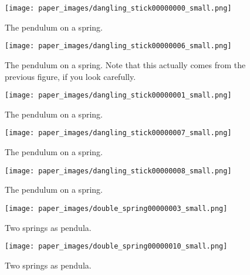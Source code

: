 \documentclass{article}
\begin{document}
\begin{figure}
\centering
\texttt{[image: paper\_images/dangling\_stick00000000\_small.png]} 
\caption{The pendulum on a spring.}
\end{figure}

\begin{figure}
\centering
\texttt{[image: paper\_images/dangling\_stick00000006\_small.png]} 
\caption{The pendulum on a spring. Note that this actually comes from the previous figure, if you look carefully.}
\end{figure}

\begin{figure}
\centering
\texttt{[image: paper\_images/dangling\_stick00000001\_small.png]} 
\caption{The pendulum on a spring.}
\end{figure}

\begin{figure}
\centering
\texttt{[image: paper\_images/dangling\_stick00000007\_small.png]} 
\caption{The pendulum on a spring.}
\end{figure}

\begin{figure}
\centering
\texttt{[image: paper\_images/dangling\_stick00000008\_small.png]} 
\caption{The pendulum on a spring.}
\end{figure}


\begin{figure}
\centering
\texttt{[image: paper\_images/double\_spring00000003\_small.png]} 
\caption{Two springs as pendula.}
\end{figure}

\begin{figure}
\centering
\texttt{[image: paper\_images/double\_spring00000010\_small.png]} 
\caption{Two springs as pendula.}
\end{figure}
\end{document}
